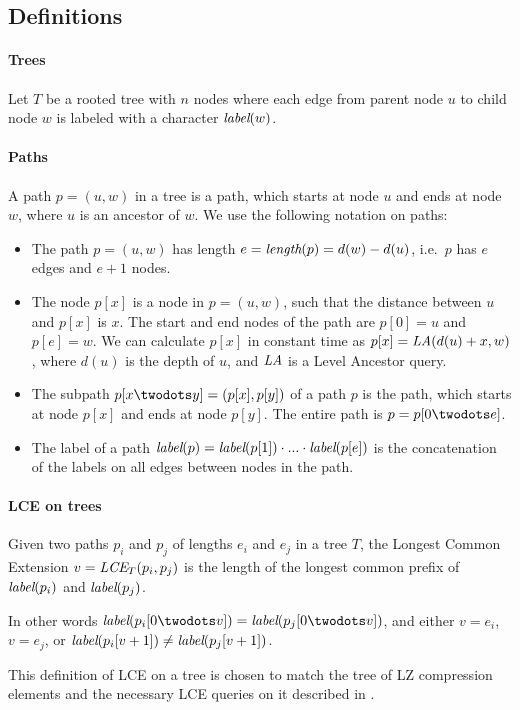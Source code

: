 \documentclass[a4]{article}
\newcommand*{\pref}{\prettyref}
\begin{document}
\subsection{Definitions\label{sec:tree-def}}

\paragraph{Trees}
Let $T$ be a rooted tree with $n$ nodes where each edge from parent node $u$ to child node $w$ is labeled with a character $\textit{label}(w)$.

\paragraph{Paths}
A path $p=(u,w)$ in a tree is a path, which starts at node $u$ and ends at node $w$, where $u$ is an ancestor of $w$. We use the following notation on paths:
\begin{itemize}
\item The path $p=(u,w)$ has length $e=\textit{length}(p)=d(w)-d(u)$, i.e.\ $p$ has $e$ edges and $e+1$ nodes.
\item The node $p[x]$ is a node in $p=(u,w)$, such that the distance between $u$ and $p[x]$ is $x$. The start and end nodes of the path are $p[0]=u$ and $p[e]=w$. We can calculate $p[x]$ in constant time as $p[x]=\textit{LA}(d(u)+x,w)$, where $d(u)$ is the depth of $u$, and $\textit{LA}$ is a Level Ancestor query.
\item The subpath $p[x\twodots y]=(p[x],p[y])$ of a path $p$ is the path, which starts at node $p[x]$ and ends at node $p[y]$. The entire path is $p = p[0\twodots e]$.
\item The label of a path $\textit{label}(p)=\textit{label}(p[1])\cdot...\cdot\textit{label}(p[e])$ is the concatenation of the labels on all edges between nodes in the path.
\end{itemize}

\paragraph{LCE on trees}
Given two paths $p_i$ and $p_j$ of lengths $e_i$ and $e_j$ in a tree $T$, the Longest Common Extension $v=\textit{LCE}_T(p_i, p_j)$ is the length of the longest common prefix of $\textit{label}(p_i)$ and $\textit{label}(p_j)$.

In other words $\zlabel(p_i[0\twodots v])=\zlabel(p_j[0\twodots v])$, and either $v=e_i$, $v=e_j$, or $\textit{label}(p_i[v+1]) \neq \textit{label}(p_j[v+1])$.

This definition of LCE on a tree is chosen to match the tree of LZ compression elements and the necessary LCE queries on it described in \pref{sec:lz-other}.
\end{document}
